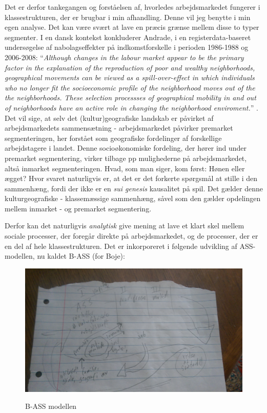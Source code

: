 Det er derfor tankegangen og forståelsen af, hvorledes arbejdsmarkedet fungerer i klassestrukturen, der er brugbar i min afhandling. Denne vil jeg benytte i min egen analyse. 
Det kan være svært at lave en præcis grænse mellem disse to typer segmenter. I en dansk kontekst konkluderer Andrade, i en registerdata-baseret undersøgelse af nabolagseffekter på indkomstforskelle i perioden 1986-1988 og 2006-2008: “\emph{Although changes in the labour market appear to be the primary factor in the explanation of the reproduction of poor and wealthy neighborhoods, geographical movements can be viewed as a spill-over-effect in which individuals who no longer fit the socioeconomic profile of the neighborhood moves out of the the neighborhoods. These selection processses of geographical mobility in and out of neighborhoods have an active role in changing the neighborhood enviroment.}” \parencite[134]{Andrade2014}. Det vil sige, at selv det (kultur)geografiske landskab er påvirket af arbejdsmarkedets sammensætning - arbejdsmarkedet påvirker premarket segmenteringen, her forstået som geografiske fordelinger af forskellige arbejdstagere i landet. Denne socioøkonomiske fordeling, der hører ind under premarket segmentering, virker tilbage pp mulighederne på arbejdsmarkedet, altså inmarket segmenteringen. Hvad, som man siger, kom først: Hønen eller ægget? Hvor svaret naturligvis er, at det er det forkerte spørgsmål at stille i den sammenhæng, fordi der ikke er en \emph{sui genesis} kausalitet på spil. Det gælder denne kulturgeografiske - klassemæssige sammenhæng, såvel som den gælder opdelingen mellem inmarket - og premarket segmentering. 

Derfor kan det naturligvis \emph{analytisk} give mening at lave et klart skel mellem sociale processer, der foregår direkte på arbejdsmarkedet, og de processer, der er en del af hele klassestrukturen. Det er inkorporeret i følgende udvikling af ASS-modellen, nu kaldet B-ASS (for Boje): 
%
\begin{figure}[H]
\begin{centering}
	\caption{B-ASS modellen}
	\includegraphics[width=\textwidth]{fig/B-ASS-model.jpg}
	\label{fig_B-ASSmodel}
\end{centering}
\end{figure}
%


